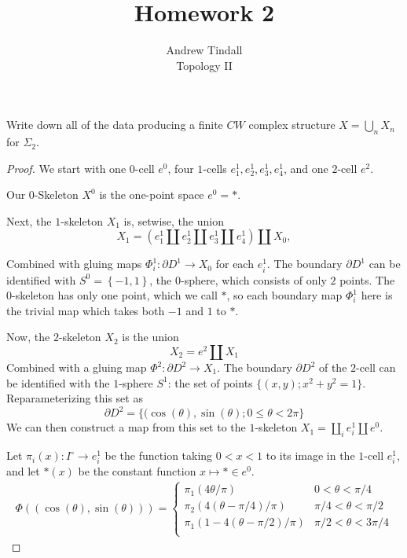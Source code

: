 \documentclass[12pt]{article}
\theoremstyle{definition}
\newenvironment{problem}[2][Problem]{\begin{trivlist}
\item[\hskip \labelsep {\bfseries #1}\hskip \labelsep {\bfseries #2.}]}{\end{trivlist}}
\begin{document}
 
 
\title{Homework 2}
\author{Andrew Tindall\\
Topology II}
 
\maketitle
\begin{problem}{1}
Write down all of the data producing a finite $CW$ complex structure $X = \bigcup_n X_n$ for $\Sigma_2$. 
\begin{proof}
    We start with one $0$-cell $e^0$, four $1$-cells $e_1^1, e_2^1, e_3^1, e_4^1$, and one $2$-cell $e^2$.
    \par Our $0$-Skeleton $X^0$ is the one-point space $e^0 = *$.
    \par Next, the $1$-skeleton $X_1$ is, setwise, the union 
    \[ X_1 = \left ( e_1^1 \amalg e_2^1 \amalg e_3^1 \amalg e_4^1\right ) \amalg X_0,\]
    \par Combined with gluing maps $\Phi^1_i: \partial D^1 \to X_0$ for each $e^1_i$. The boundary $\partial D^1$ can be identified with $S^0 = \left\{ -1, 1 \right\}$, the $0$-sphere, which consists of only $2$ points. The $0$-skeleton has only one point, which we call $*$, so each boundary map $\Phi^1_i$ here is the trivial map which takes both $-1$ and $1$ to $*$.
    \par Now, the $2$-skeleton $X_2$ is the union
    \[X_2 = e^2 \amalg X_1 \]
    Combined with a gluing map $\Phi^2: \partial D^2 \to X_1$. The boundary $\partial D^2$ of the $2$-cell can be identified with the $1$-sphere $S^1$: the set of points $\{ (x,y) ; x^2 + y^2 = 1\}$. Reparameterizing this set as 
    \[
    \partial D^2 = \{ (\cos(\theta), \sin(\theta); 0 \leq \theta < 2\pi\}
    \]
    We can then construct a map from this set to the $1$-skeleton $X_1 = \coprod_i e^1_i \amalg e^0$. 
    \par Let $\pi_i(x): I^\circ \to e^1_i$ be the function taking $0 < x < 1$ to its image in the $1$-cell $e_i^1$, and let $*(x)$ be the constant function $x \mapsto * \in e^0$.
    \begin{align*}
	    \Phi( (\cos(\theta), \sin(\theta))) = \begin{cases}
		    \pi_1(4\theta / \pi) & 0 < \theta < \pi / 4\\
		    \pi_2(4(\theta - \pi / 4) / \pi) & \pi / 4 < \theta < \pi / 2\\
		    \pi_1(1 - 4(\theta - \pi / 2) / \pi) & \pi / 2 < \theta < 3 \pi / 4\\

\end{cases}
\end{align*}
\end{proof}
\end{problem}
\end{document}
